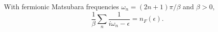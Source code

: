 \documentclass{article}
\begin{document}
With fermionic Matsubara frequencies $\omega_n = (2n+1)\pi/\beta$ and $\beta>0$,
\begin{equation}
\frac{1}{\beta}\sum_{n} \frac{1}{i\omega_n - \epsilon} = n_F(\epsilon) .
\label{eq:occ}
\end{equation}
\end{document}
